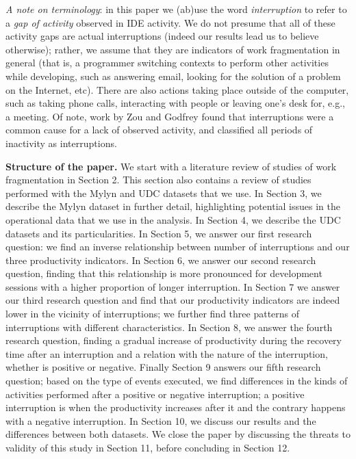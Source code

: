 \documentclass[times]{smrauth}
\newcommand\RR[1]{\textbf{Romain #1}}
\begin{document}


\emph{A note on terminology}: in this paper we (ab)use the word \emph{interruption} to refer to a \emph{gap of activity} observed in IDE activity. We do not presume that all of these activity gaps are actual interruptions (indeed our results lead us to believe otherwise); rather, we assume that they are indicators of work fragmentation in general (that is, a programmer switching contexts to perform other activities while developing, such as answering email, looking for the solution of a problem on the Internet, etc). 
There are also actions taking place outside of the computer, such as taking phone calls, interacting with people or leaving one's desk for, e.g., a meeting. 
Of note, work by Zou and Godfrey \cite{ZG06} found that interruptions were a common cause for a lack of observed activity, and classified all periods of inactivity as interruptions. %

\textbf{Structure of the paper.} We start with a literature review of studies of work fragmentation in Section 2. This section also contains a review of studies performed with the Mylyn and UDC datasets that we use. In Section 3, we describe the Mylyn dataset in further detail, highlighting potential issues in the operational data that we use in the analysis. In Section 4, we describe the UDC datasets and its particularities. In Section 5, we answer our first research question: we find an inverse relationship between number of interruptions and our three productivity indicators. In Section 6, we answer our second research question, finding that this relationship is more pronounced for development sessions with a higher proportion of longer interruption. In Section 7 we answer our third research question and find that our productivity indicators are indeed lower in the vicinity of interruptions; we further find three patterns of interruptions with different characteristics. In Section 8, we answer the fourth research question, finding a gradual increase of productivity during the recovery time after an interruption and a relation with the nature of the interruption, whether is positive or negative. Finally Section 9 answers our fifth research question; based on the type of events executed, we find differences in the kinds of activities performed after a positive or negative interruption; a positive interruption is when the productivity increases after it and the contrary happens with a negative interruption. In Section 10, we discuss our results and the differences between both datasets. We close the paper by discussing the threats to validity of this study in Section 11, before concluding in Section 12.
\end{document}
